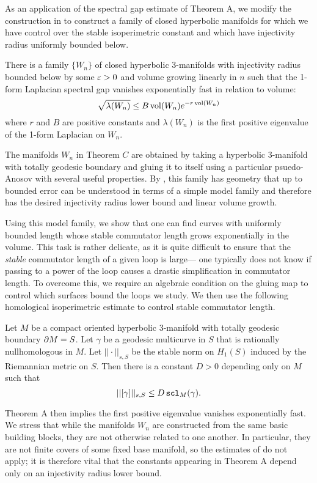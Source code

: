 {As an application of the spectral gap estimate of Theorem A, we modify the construction in \cite{BD} to construct a family of closed hyperbolic manifolds for which we have control over the stable isoperimetric constant and which have injectivity radius uniformly bounded below.

\begin{bigthm}\label{thm:C} There is a family $\{W_n\}$ of closed hyperbolic 3-manifolds with injectivity radius bounded below by some $\varepsilon>0$ and volume growing linearly in $n$ such that the 1-form Laplacian spectral gap vanishes exponentially fast in relation to volume: $$\sqrt{\lambda(W_n)}\leq B \operatorname{vol}(W_n)e^{-r\operatorname{vol}(W_n)}$$ where $r$ and $B$ are positive constants and $\lambda(W_n)$ is the first positive eigenvalue of the 1-form Laplacian on $W_n$.
\end{bigthm}

The manifolds $W_n$ in Theorem $C$ are obtained by taking a hyperbolic 3-manifold with totally geodesic boundary and gluing it to itself using a particular psuedo-Anosov with several useful properties. By \cite{BMNS}, this family has geometry that up to bounded error can be understood in terms of a simple model family and therefore has the desired injectivity radius lower bound and linear volume growth.

Using this model family, we show that one can find curves with uniformly bounded length whose stable commutator length grows exponentially in the volume. This task is rather delicate, as it is quite difficult to ensure that the \emph{stable} commutator length of a given loop is large--- one typically does not know if passing to a power of the loop causes a drastic simplification in commutator length. To overcome this, we require an algebraic condition on the gluing map to control which surfaces bound the loops we study. We then use the following homological isoperimetric estimate to control stable commutator length.

 \begin{thm} Let $M$ be a compact oriented hyperbolic 3-manifold with totally geodesic boundary $\partial M = S$. Let $\gamma$ be a geodesic multicurve in $S$ that is rationally nullhomologous in $M$. Let $||\cdot||_{s,S}$ be the stable norm on $H_1(S)$ induced by the Riemannian metric on $S.$ Then there is a constant $D> 0$ depending only on $M$ such that $$||[\gamma]||_{s,S}\leq D\operatorname{{\tt{scl}}}_M(\gamma).$$ \end{thm}


 Theorem A then implies the first positive eigenvalue vanishes exponentially fast. We stress that while the manifolds $W_n$ are constructed from the same basic building blocks, they are not otherwise related to one another. In particular, they are not finite covers of some fixed base manifold, so the estimates of \cite{LS} do not apply; it is therefore vital that the constants appearing in Theorem A depend only on an injectivity radius lower bound.

}
